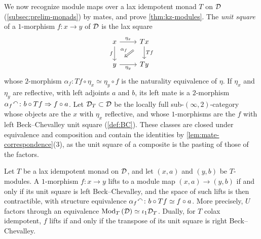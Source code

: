%
We now recognize module maps over a lax idempotent monad $T$ on $\mathcal{D}$
(\cref{subsec:prelim-monads}) by mates, and prove \cref{thm:kz-modules}.
The \emph{unit square} of a $1$-morphism $f\colon x \to y$ of $\mathcal{D}$ is the lax
square
\begin{equation*}
\begin{tikzcd}
x \ar[r, "\eta_{x}"] \ar[d, "f"'] & Tx \ar[d, "Tf"] \ar[dl, Rightarrow,
shorten=3mm, "\alpha_{f}"'] \\
y \ar[r, "\eta_{y}"'] & Ty
\end{tikzcd}
\end{equation*}
whose $2$-morphism
$\alpha_{f}\colon Tf \circ \eta_{x} \simeq \eta_{y} \circ f$
is the naturality equivalence of $\eta$. If $\eta_{x}$ and $\eta_{y}$ are
reflective, with left adjoints $a$ and $b$, its left mate is a $2$-morphism
${\alpha_{f}}^{\curvearrowleft}\colon b \circ Tf \Rightarrow f \circ a$.
Let
$\mathcal{D}_{T} \subset \mathcal{D}$
be the locally full sub-$(\infty,2)$-category whose objects are the $x$ with
$\eta_{x}$ reflective, and whose $1$-morphisms are the $f$ with left
Beck--Chevalley unit square (\cref{def:BC}).
These classes are closed under equivalence and composition and contain the
identities by \cref{lem:mate-correspondence}(3), as the unit square of a
composite is the pasting of those of the factors.

\begin{thm}
\label{thm:kz-module-maps}
%
Let $T$ be a lax idempotent monad on $\mathcal{D}$, and let $(x,a)$ and $(y,b)$ be
$T$-modules. A $1$-morphism $f\colon x \to y$ lifts to a module map $(x,a) \to
(y,b)$ if and only if its unit square is left Beck--Chevalley, and the space of
such lifts is then contractible, with structure equivalence
${\alpha_{f}}^{\curvearrowleft}\colon b \circ Tf \simeq f \circ a$.
More precisely, $U$ factors through an equivalence
${\operatorname{Mod}_{T}\left(\mathcal{D}\right)} \simeq \iota_{1}\mathcal{D}_{T}$.
Dually, for $T$ colax idempotent, $f$ lifts if and only if the transpose of its
unit square is right Beck--Chevalley.
\end{thm}


